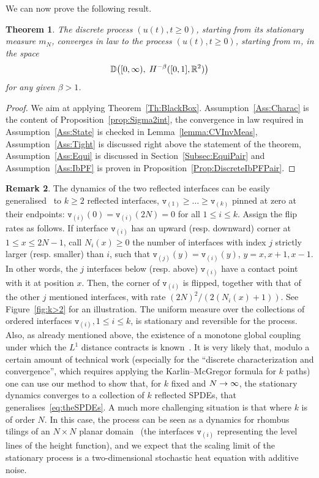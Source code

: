\documentclass[10pt]{amsart}
\newtheorem{theo}{Theorem}[section]
\theoremstyle{definition}\newtheorem{defi}[theo]{Definition}\newtheorem{rema}[theo]{Remark}\newtheorem{exam}[theo]{Example}\newtheorem{exem}[theo]{Example}\newtheorem{nota}[theo]{Notation}
\theoremstyle{plain}
\newcommand{\ttv}{\mathtt{v}}
\newcommand{\bbD}{\mathbb{D}}
\newcommand{\R}{\mathbb{R}}
\let\originalleft\left
\let\originalright\right
\renewcommand{\left}{\mathopen{}\mathclose\bgroup\originalleft}
\renewcommand{\right}{\aftergroup\egroup\originalright}
\renewcommand*{\to}{\mathchoice{\longrightarrow}{\rightarrow}{\rightarrow}{\rightarrow}}
\begin{document}
We can now prove the following result.


\begin{theo}\label{Th:Pair}
The discrete process $(u(t), t\ge 0)$, starting from its stationary measure $m_N$, converges in law to the process $(u(t),t\ge 0)$, starting from $m$, in the space
\[
\bbD\left([0,\infty),\;H^{-\beta}([0,1], \R^2)\right)
\]
for any given $\beta > 1$.
\end{theo}

\begin{proof}
We aim at applying Theorem~\ref{Th:BlackBox}. Assumption~\ref{Ass:Charac} is the content of Proposition~\ref{prop:Sigma2int}, the convergence in law required in Assumption~\ref{Ass:State} is checked in Lemma~\ref{lemma:CVInvMeas}, Assumption~\ref{Ass:Tight} is discussed right above the statement of the theorem, Assumption~\ref{Ass:Equi} is discussed in Section~\ref{Subsec:EquiPair} and Assumption~\ref{Ass:IbPF} is proven in Proposition~\ref{Prop:DiscreteIbPFPair}.
\end{proof}


\begin{rema}\label{rem:k>2}
The dynamics of the two reflected
interfaces can be easily generalised~\cite{luby2001markov,wilson2004mixing} to $k\ge 2$ reflected interfaces, $\ttv_{(1)}\ge \dots\ge \ttv_{(k)}$ pinned at zero at their endpoints: $\ttv_{(i)}(0)=\ttv_{(i)}(2N)=0$ for all $1\le i\le k$. Assign the flip rates as follows. If interface $\ttv_{(i)}$ has an upward (resp. downward) corner at $1\le x\le 2N-1$, call $N_i(x)\ge0$ the number of interfaces with index $j$ strictly larger (resp. smaller) than $i$, such that $\ttv_{(j)}(y)=\ttv_{(i)}(y)$, $y=x,x+1,x-1$. In other words, the $j$ interfaces below (resp. above) $\ttv_{(i)}$ have a contact point with it at position $x$. Then, the corner of $\ttv_{(i)}$ is flipped, together with that of the other $j$ mentioned interfaces, with rate $(2N)^2/(2 (N_i(x)+1))$. See Figure~\ref{fig:k>2} for an illustration. The uniform measure over the collections of ordered interfaces $\ttv_{(i)},1\le i\le k$, is stationary and reversible for the process. Also, as already mentioned above, the existence of a monotone global coupling under which the $L^1$ distance contracts is known~\cite{wilson2004mixing}. It is very likely that, modulo a certain amount of technical work (especially for the ``discrete characterization and convergence'', which requires applying the Karlin--McGregor formula for $k$ paths) one can use our method to show that, for $k$ fixed and $N\to\infty$, the stationary dynamics converges to a collection of $k$ reflected SPDEs, that generalises~\eqref{eq:theSPDEs}. A much more challenging situation is that where $k$ is of order $N$. In this case, the process can be seen as a dynamics for rhombus tilings of an $N\times N$ planar domain~\cite{wilson2004mixing} (the interfaces $\ttv_{(i)}$ representing the level lines of the height function), and we expect that the scaling limit of the stationary process is a two-dimensional stochastic heat equation with additive noise.
\end{rema}
\end{document}
